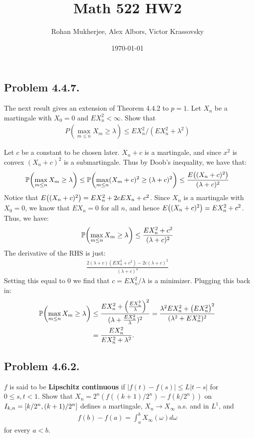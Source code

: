 \documentclass[12pt]{article}
\title{Math 522 HW2}
\date{\today}
\author{Rohan Mukherjee, Alex Albors, Victor Krassovsky}
\theoremstyle{definitionstyle}
\newcommand{\1}{\mathds 1}
\renewcommand{\P}{\mathbb P \qty}
\begin{document}
    \maketitle
    \subsection*{Problem 4.4.7.}
    The next result gives an extension of Theorem 4.4.2 to $p = 1$. Let $X_n$ be a martingale with $X_0 = 0$ and $E X_n^2 < \infty$. Show that
    \begin{align*}
        P(\max_{m \leq n} X_m \geq \lambda) \leq E X_n^2 / (E X_n^2 + \lambda^2)
    \end{align*}

    Let $c$ be a constant to be chosen later. $X_n + c$ is a martingale, and since $x^2$ is convex $(X_n+c)^2$ is a submartingale. Thus by Doob's inequality, we have that:
    \begin{align*}
        \P(\max_{m \leq n} X_m \geq \lambda) \leq \P(\max_{m \leq n} (X_m + c)^2 \geq (\lambda+c)^2) \leq \frac{E\qty((X_n+c)^2)}{(\lambda+c)^2}
    \end{align*}
    Notice that $E\qty((X_n+c)^2) = E X_n^2 + 2c E X_n + c^2$. Since $X_n$ is a martingale with $X_0 = 0$, we know that $E X_n = 0$ for all $n$, and hence $E\qty((X_n+c)^2) = E X_n^2 + c^2$. Thus, we have:
    \begin{align*}
        \P(\max_{m \leq n} X_m \geq \lambda) \leq \frac{E X_n^2 + c^2}{(\lambda+c)^2}
    \end{align*}
    The  derivative of the RHS is just:
    \begin{align*}
        \frac{2(\lambda + c)(E X_n^2 + c^2) - 2c (\lambda + c)^2}{(\lambda+c)^4}
    \end{align*}
    Setting this equal to 0 we find that $c = E X_n^2 / \lambda$ is a minimizer. Plugging this back in:
    \begin{align*}
        \P(\max_{m \leq n} X_m \geq \lambda) &\leq \frac{E X_n^2 + \qty(\frac{E X_n^2}{\lambda})^2}{(\lambda + \frac{E X_n^2}{\lambda})^2} = \frac{\lambda^2EX_n^2 + \qty(E X_n^2)^2}{(\lambda^2 + E X_n^2)^2} 
        \\&= \frac{E X_n^2}{E X_n^2 + \lambda^2}.
    \end{align*}

    \subsection*{Problem 4.6.2.}
    $f$ is said to be \textbf{Lipschitz continuous} if $|f(t) - f(s)| \leq L|t-s|$ for $0 \leq s,t < 1$. Show that $X_n = 2^n (f((k+1)/2^n) - f(k/2^n))$ on $I_{k,n} = \qty[k/2^n, (k+1)/2^n]$ defines a martingale, $X_n \to X_\infty$ a.s. and in $L^1$, and 
    \begin{align*}
        f(b) - f(a) = \int_a^b X_\infty(\omega) d\omega
    \end{align*}
    for every $a < b$.
\end{document}

